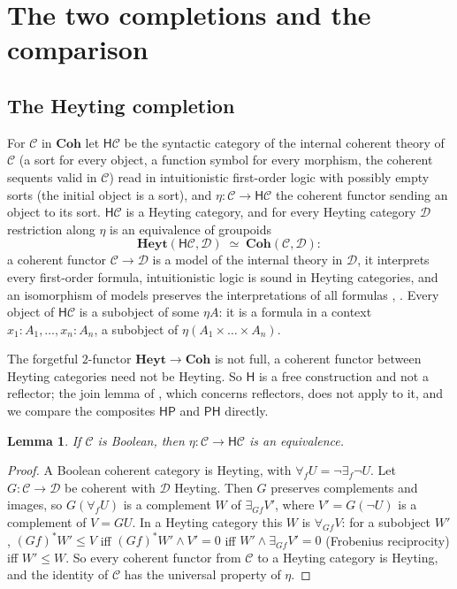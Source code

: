 \documentclass[11pt]{amsart}
\newtheorem{lem}[thm]{Lemma}
\theoremstyle{definition}
\newcommand{\Coh}{\mathbf{Coh}}
\newcommand{\Heyt}{\mathbf{Heyt}}
\newcommand{\PP}{\mathsf P}
\newcommand{\HH}{\mathsf H}
\newcommand{\cC}{\mathcal C}
\newcommand{\cD}{\mathcal D}
\begin{document}
\section{The two completions and the comparison}

\subsection*{The Heyting completion}
For $\cC$ in $\Coh$ let $\HH\cC$ be the syntactic category of the
internal coherent theory of $\cC$ (a sort for every object, a function
symbol for every morphism, the coherent sequents valid in $\cC$) read in
intuitionistic first-order logic with possibly empty sorts (the initial
object is a sort), and $\eta\colon\cC\to\HH\cC$ the
coherent functor sending an object to its sort. $\HH\cC$ is a Heyting
category, and for every Heyting category $\cD$ restriction along $\eta$
is an equivalence of groupoids
\[
\Heyt(\HH\cC,\cD)\;\simeq\;\Coh(\cC,\cD):
\]
a coherent functor $\cC\to\cD$ is a model of the internal theory in
$\cD$, it interprets every first-order formula, intuitionistic logic is
sound in Heyting categories, and an isomorphism of models preserves the
interpretations of all formulas \cite[D1.4]{Elephant},
\cite[\S9]{Morley}. Every object of $\HH\cC$ is a subobject of some
$\eta A$: it is a formula in a context $x_1{:}A_1,\dots,x_n{:}A_n$, a
subobject of $\eta(A_1\times\dots\times A_n)$.

The forgetful $2$-functor $\Heyt\to\Coh$ is not full, a coherent
functor between Heyting categories need not be Heyting. So $\HH$ is a
free construction and not a reflector; the join lemma of
\cite{TheoryComp,Morley}, which concerns reflectors, does not apply to
it, and we compare the composites $\HH\PP$ and $\PP\HH$ directly.

\begin{lem}\label{lem:boolean}
If $\cC$ is Boolean, then $\eta\colon\cC\to\HH\cC$ is an equivalence.
\end{lem}
\begin{proof}
A Boolean coherent category is Heyting, with $\forall_fU=\neg\exists_f
\neg U$. Let $G\colon\cC\to\cD$ be coherent with $\cD$ Heyting. Then
$G$ preserves complements and images, so $G(\forall_fU)$ is a
complement $W$ of $\exists_{Gf}V'$, where $V'=G(\neg U)$ is a
complement of $V=GU$. In a Heyting category this $W$ is $\forall_{Gf}
V$: for a subobject $W'$, $(Gf)^*W'\le V$ iff $(Gf)^*W'\wedge V'=0$
iff $W'\wedge\exists_{Gf}V'=0$ (Frobenius reciprocity) iff $W'\le W$.
So every coherent functor from $\cC$ to a Heyting category is Heyting,
and the identity of $\cC$ has the universal property of $\eta$.
\end{proof}
\end{document}
